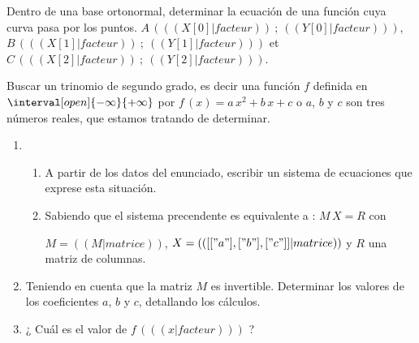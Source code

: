 \exercice
Dentro de una base ortonormal, determinar la ecuación de una función cuya curva pasa por los puntos.
$A\,( (( X[0]|facteur )) ~;~ (( Y[0]|facteur )) )$,
$B\,( (( X[1]|facteur )) ~;~ (( Y[1]|facteur )) )$ et
$C\,( (( X[2]|facteur )) ~;~ (( Y[2]|facteur )) )$.

Buscar un trinomio de segundo grado, es decir una función $f$ definida en $\interval[open]{-\infty}{+\infty}$ por
 \mbox{$f\,(x) = a\,x^2 + b\,x + c$} o $a$, $b$ y $c$ son tres números reales, que estamos tratando de determinar.

  \begin{enumerate}
    \item 
      \begin{enumerate}
        \item A partir de los datos del enunciado, escribir un sistema de ecuaciones que exprese esta situación.
        \item Sabiendo que el sistema precendente es equivalente a : $M\,X = R$ con

          $M = (( M|matrice ))$, $X= (( [["a"], ["b"], ["c"]]|matrice ))$ y $R$ una matriz de columnas.
      \end{enumerate}
  \end{enumerate}
  \begin{enumerate}
      \setcounter{enumi}{1}
    \item Teniendo en cuenta que la matriz $M$ es invertible.
      Determinar los valores de los coeficientes $a$, $b$ y $c$, detallando los cálculos.
    \item ¿ Cuál es el valor de $f\,( (( x|facteur )) )$ ?

  \end{enumerate}
